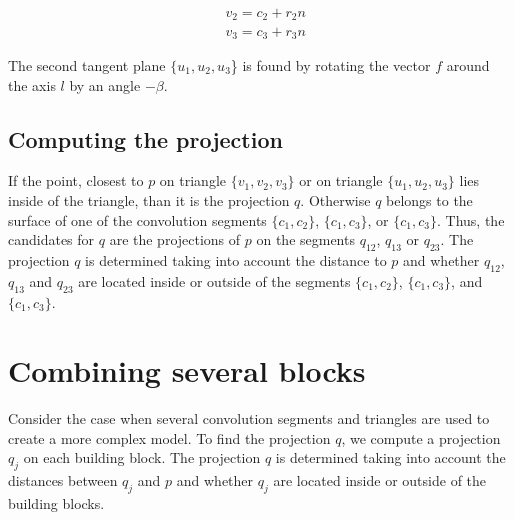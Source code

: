 \begin{align}
	& v_2 = c_2  + r_2 n \\
	& v_3 = c_3 + r_3 n 
\end{align}

The second tangent plane $\{u_1, u_2, u_3$\} is found by rotating the vector $f$ around the axis $l$ by an angle $-\beta$.



\subsection{Computing the projection}

If the point, closest to $p$ on triangle $\{v_1, v_2, v_3\}$ or on triangle $\{u_1, u_2, u_3\}$ lies inside of the triangle, than it is the projection $q$. Otherwise $q$ belongs to the surface of one of the convolution segments $\{c_1, c_2\}$,  $\{c_1, c_3\}$, or  $\{c_1, c_3\}$. Thus, the candidates for $q$ are the projections of $p$ on the segments $q_{12}$, $q_{13}$ or $q_{23}$. The projection $q$ is determined taking into account the distance to $p$ and whether  $q_{12}$, $q_{13}$ and $q_{23}$ are located inside or outside of the segments $\{c_1, c_2\}$,  $\{c_1, c_3\}$, and  $\{c_1, c_3\}$.  


\section{Combining several blocks}

Consider the case when several convolution segments and triangles are used to create a more complex model. To find the projection $q$, we compute a projection $q_j$ on each  building block.  The projection $q$ is determined taking into account the distances between $q_j$ and $p$ and whether  $q_j$ are located inside or outside of the building blocks.


